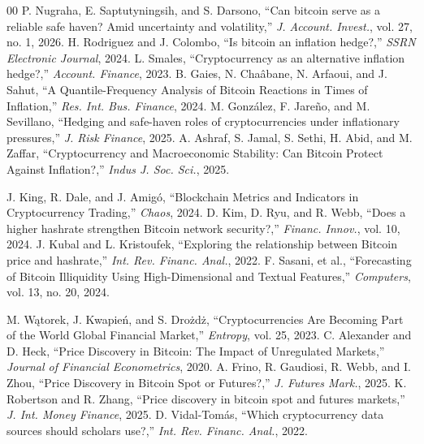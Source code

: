 \documentclass[10pt, conference, compsocconf]{IEEEtran}
\begin{document}
\begin{thebibliography}{00}
 P. Nugraha, E. Saptutyningsih, and S. Darsono, ``Can bitcoin serve as a reliable safe haven? Amid uncertainty and volatility,'' \textit{J. Account. Invest.}, vol. 27, no. 1, 2026.
 H. Rodriguez and J. Colombo, ``Is bitcoin an inflation hedge?,'' \textit{SSRN Electronic Journal}, 2024.
 L. Smales, ``Cryptocurrency as an alternative inflation hedge?,'' \textit{Account. Finance}, 2023.
 B. Gaies, N. Chaâbane, N. Arfaoui, and J. Sahut, ``A Quantile-Frequency Analysis of Bitcoin Reactions in Times of Inflation,'' \textit{Res. Int. Bus. Finance}, 2024.
 M. González, F. Jareño, and M. Sevillano, ``Hedging and safe-haven roles of cryptocurrencies under inflationary pressures,'' \textit{J. Risk Finance}, 2025.
 A. Ashraf, S. Jamal, S. Sethi, H. Abid, and M. Zaffar, ``Cryptocurrency and Macroeconomic Stability: Can Bitcoin Protect Against Inflation?,'' \textit{Indus J. Soc. Sci.}, 2025.

 J. King, R. Dale, and J. Amigó, ``Blockchain Metrics and Indicators in Cryptocurrency Trading,'' \textit{Chaos}, 2024.
 D. Kim, D. Ryu, and R. Webb, ``Does a higher hashrate strengthen Bitcoin network security?,'' \textit{Financ. Innov.}, vol. 10, 2024.
 J. Kubal and L. Kristoufek, ``Exploring the relationship between Bitcoin price and hashrate,'' \textit{Int. Rev. Financ. Anal.}, 2022.
 F. Sasani, et al., ``Forecasting of Bitcoin Illiquidity Using High-Dimensional and Textual Features,'' \textit{Computers}, vol. 13, no. 20, 2024.

 M. Wątorek, J. Kwapień, and S. Drożdż, ``Cryptocurrencies Are Becoming Part of the World Global Financial Market,'' \textit{Entropy}, vol. 25, 2023.
 C. Alexander and D. Heck, ``Price Discovery in Bitcoin: The Impact of Unregulated Markets,'' \textit{Journal of Financial Econometrics}, 2020.
 A. Frino, R. Gaudiosi, R. Webb, and I. Zhou, ``Price Discovery in Bitcoin Spot or Futures?,'' \textit{J. Futures Mark.}, 2025.
 K. Robertson and R. Zhang, ``Price discovery in bitcoin spot and futures markets,'' \textit{J. Int. Money Finance}, 2025.
 D. Vidal-Tomás, ``Which cryptocurrency data sources should scholars use?,'' \textit{Int. Rev. Financ. Anal.}, 2022.


\end{thebibliography}
\end{document}
